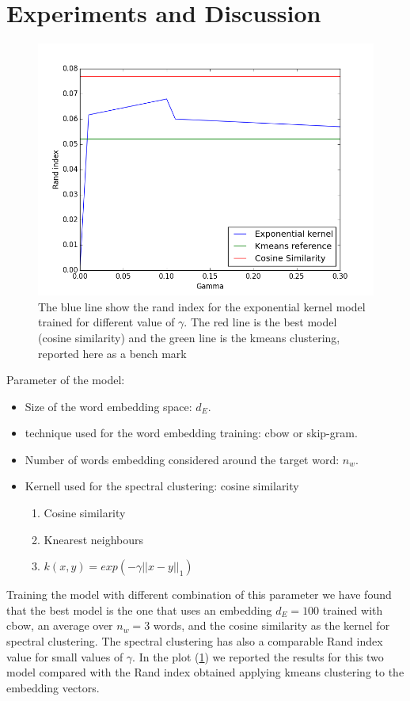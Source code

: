 \documentclass[]{article}
\begin{document}
\section{Experiments and Discussion}
\begin{figure}  \label{best} 
\includegraphics[width=1\linewidth]{results.png} 
    \caption{The blue line show the rand index for the  exponential kernel model trained for different value of $\gamma$. The red line is the best model (cosine similarity) and the green line is the kmeans clustering, reported here as a bench mark } 
\end{figure}
Parameter of the model:
\begin{itemize}  \label{confusion} 
\item Size of the word  embedding space: $d_E$.
\item technique used for the word embedding training: cbow  or skip-gram.
\item Number of words embedding considered around the target word: $n_w$.
\item Kernell used for the spectral clustering: cosine similarity 
\begin{enumerate}
\item Cosine similarity 
\item Knearest neighbours 
\item $k(x,y)=exp(-\gamma ||x-y||_1)$
\end{enumerate} 
\end{itemize}  
Training the model with different combination of this parameter we have found that the best model is the one that uses an embedding $d_E=100$ trained with cbow, an average over $n_w=3$ words, and the cosine similarity as the kernel for spectral clustering. The spectral clustering has also a comparable Rand index value for small values of $\gamma$. In the plot (\ref{best}) we reported the results for this two model compared with the Rand index obtained applying kmeans clustering to the embedding vectors. 
\end{document}
